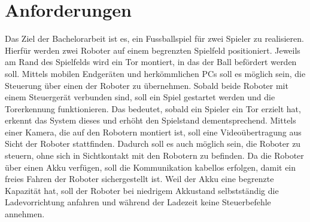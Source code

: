 \section{Anforderungen}

Das Ziel der Bachelorarbeit ist es, ein Fussballspiel für zwei Spieler zu realisieren. Hierfür werden zwei Roboter auf einem begrenzten Spielfeld positioniert. Jeweils am Rand des Spielfelds wird ein Tor montiert, in das der Ball befördert werden soll. Mittels mobilen Endgeräten und herkömmlichen PCs soll es möglich sein, die Steuerung über einen der Roboter zu übernehmen. Sobald beide Roboter mit einem Steuergerät verbunden sind, soll ein Spiel gestartet werden und die Torerkennung funktionieren. Das bedeutet, sobald ein Spieler ein Tor erzielt hat, erkennt das System dieses und erhöht den Spielstand dementsprechend. Mittels einer Kamera, die auf den Robotern montiert ist, soll eine Videoübertragung aus Sicht der Roboter stattfinden. Dadurch soll es auch möglich sein, die Roboter zu steuern, ohne sich in Sichtkontakt mit den Robotern zu befinden. Da die Roboter über einen Akku verfügen, soll die Kommunikation kabellos erfolgen, damit ein freies Fahren der Roboter sichergestellt ist. Weil der Akku eine begrenzte Kapazität hat, soll der Roboter bei niedrigem Akkustand selbstständig die Ladevorrichtung anfahren und während der Ladezeit keine Steuerbefehle annehmen. 